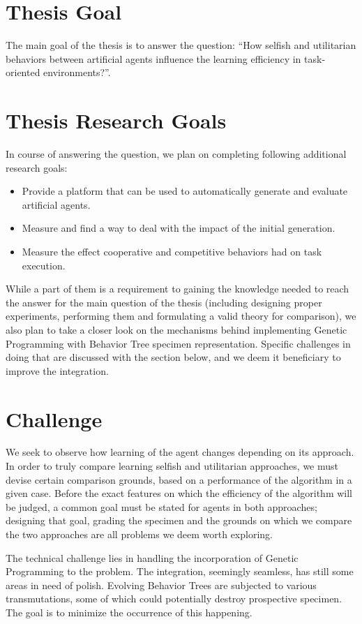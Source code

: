 \section{Thesis Goal}
The main goal of the thesis is to answer the question:
``How selfish and utilitarian behaviors between artificial agents influence the learning efficiency in task-oriented environments?''.

\section{Thesis Research Goals}
In course of answering the question, we plan on completing following additional research goals:

\begin{itemize}
    \item Provide a platform that can be used to automatically generate and evaluate artificial agents.
    \item Measure and find a way to deal with the impact of the initial generation.
    \item Measure the effect cooperative and competitive behaviors had on task execution.
\end{itemize}

While a part of them is a requirement to gaining the knowledge needed to reach the answer for the main question of the thesis (including designing proper experiments, performing them and formulating a valid theory for comparison), we also plan to take a closer look on the mechanisms behind implementing Genetic Programming with Behavior Tree specimen representation. Specific challenges in doing that are discussed with the section below, and we deem it beneficiary to improve the integration.

\section{Challenge}
We seek to observe how learning of the agent changes depending on its approach. In order to truly compare learning selfish and utilitarian approaches, we must devise certain comparison grounds, based on a performance of the algorithm in a given case. Before the exact features on which the efficiency of the algorithm will be judged, a common goal must be stated for agents in both approaches; designing that goal, grading the specimen and the grounds on which we compare the two approaches are all problems we deem worth exploring.

The technical challenge lies in handling the incorporation of Genetic Programming to the problem. The integration, seemingly seamless, has still some areas in need of polish. Evolving Behavior Trees are subjected to various transmutations, some of which could potentially destroy prospective specimen. The goal is to minimize the occurrence of this happening.

